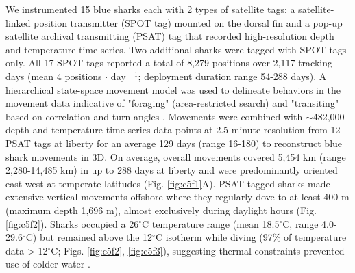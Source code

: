 We instrumented 15 blue sharks each with 2 types of satellite tags: a satellite-linked position transmitter (SPOT tag) mounted on the dorsal fin and a pop-up satellite archival transmitting (PSAT) tag that recorded high-resolution depth and temperature time series. Two additional sharks were tagged with SPOT tags only. All 17 SPOT tags reported a total of 8,279 positions over 2,117 tracking days (mean 4 positions $\cdot$ day $^{-1}$; deployment duration range 54-288 days). A hierarchical state-space movement model was used to delineate behaviors in the movement data indicative of "foraging" (area-restricted search) and "transiting" based on correlation and turn angles \citep{Jonsen2016}. Movements were combined with $\sim$482,000 depth and temperature time series data points at 2.5 minute resolution from 12 PSAT tags at liberty for an average 129 days (range 16-180) to reconstruct blue shark movements in 3D. On average, overall movements covered 5,454 km (range 2,280-14,485 km) in up to 288 days at liberty and were predominantly oriented east-west at temperate latitudes (Fig. \ref{fig:c5f1}A). PSAT-tagged sharks made extensive vertical movements offshore where they regularly dove to at least 400 m (maximum depth 1,696 m), almost exclusively during daylight hours (Fig. \ref{fig:c5f2}). Sharks occupied a 26$^\circ$C temperature range (mean 18.5$^\circ$C, range 4.0-29.6$^\circ$C) but remained above the 12$^\circ$C isotherm while diving (97\% of temperature data > 12$^\circ$C; Figs. \ref{fig:c5f2}, \ref{fig:c5f3}), suggesting thermal constraints prevented use of colder water \citep{Carey1990}.

